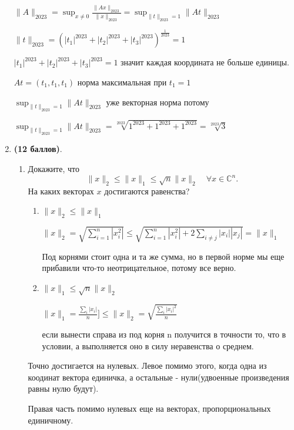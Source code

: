 \documentclass[a4paper, 11pt]{article}
\newcommand{\prob}[1]{\item \textbf{(#1 баллов)}.}
\begin{document}
\begin{enumerate}
			$\|A\|_{2023} = \sup_{x \neq 0} \frac{\|Ax\|_{2023}}{\|x\|_{2023}} = \sup_{\|t\|_{2023}  = 1} \|At\|_{2023}$	
			
			$\|t\|_{2023} = (|t_1|^{2023} + |t_2|^{2023} + |t_3|^{2023})^{\frac{1}{2023}} = 1$
			
			$|t_1|^{2023} + |t_2|^{2023} + |t_3|^{2023} = 1$ значит каждая координата не больше единицы.
			
			$At = (t_1, t_1, t_1)$ норма максимальная при $t_1 = 1$ 
			
			$\sup_{\|t\|_{2023}  = 1} \|At\|_{2023}$ уже векторная норма потому 
			
			$\sup_{\|t\|_{2023}  = 1} \|At\|_{2023} = \sqrt[2023]{1^{2023} + 1^{2023} + 1^{2023}} = \sqrt[2023]{3}$
		
		
		
		\prob{12}
		\begin{enumerate}
			\item Докажите, что 
			\[
			\|x\|_2 \leq \|x\|_1 \leq \sqrt{n} \|x\|_2 \quad \forall
			x\in\mathbb{C}^n.
			\]
			На каких векторах $x$ достигаются равенства?
			
				\begin{enumerate}
					\item $\|x\|_2 \leq \|x\|_1$
						
						$\displaystyle \|x\|_2 = \sqrt{\sum_{i = 1}^{n} |x_i^2|} \leqslant \sqrt{\sum_{i = 1}^{n} |x_i^2| + 2 \sum_{i \neq j} |x_i||x_j|} = \| x \|_1$
						
						Под корнями стоит одна и та же сумма, но в первой норме мы еще прибавили что-то неотрицательное, потому все верно.
						
					\item $\|x\|_1 \leq \sqrt{n} \|x\|_2$
					
							\medskip
					
						$\displaystyle \| x\|_1 = \frac{\displaystyle \sum_{i} |x_i|}{n}] \leqslant \| x \|_2 = \sqrt{\frac{\displaystyle \sum_i |x_i|^2}{n}}$
						
						если вынести справа из под корня n получится в точности то, что в условии, а выполняется оно в силу неравенства о среднем.
						
						
				\end{enumerate}
			
			Точно достигается на нулевых. Левое помимо этого, когда одна из коодинат вектора единичка, а остальные - нули(удвоенные произведения равны нулю будут).
			
			Правая часть помимо нулевых еще на векторах, пропорциональных единичному.			
			

\end{enumerate}
\end{enumerate}
\end{document}

